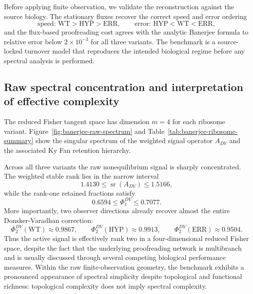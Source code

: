 \documentclass[11pt,a4paper]{article}
\numberwithin{equation}{section}
\theoremstyle{thmcompact}
\theoremstyle{remark}
\begin{document}
Before applying finite observation, we validate the reconstruction against the source biology. The stationary fluxes recover the correct speed and error ordering
\begin{equation}
\text{speed: WT} > \text{HYP} > \text{ERR},
\qquad
\text{error: HYP} < \text{WT} < \text{ERR},
\end{equation}
and the flux-based proofreading cost agrees with the analytic Banerjee formula to relative error below \(2\times 10^{-3}\) for all three variants. The benchmark is a source-locked turnover model that reproduces the intended biological regime before any spectral analysis is performed.

\subsection{Raw spectral concentration and interpretation of effective complexity}

The reduced Fisher tangent space has dimension \(m=4\) for each ribosome variant. Figure~\ref{fig:banerjee-raw-spectrum} and Table~\ref{tab:banerjee-ribosome-summary} show the singular spectrum of the weighted signal operator \(A_{DV}\) and the associated Ky Fan retention hierarchy.

Across all three variants the raw nonequilibrium signal is sharply concentrated. The weighted stable rank lies in the narrow interval
\begin{equation}
1.4130 \leq \operatorname{sr}(A_{DV}) \leq 1.5166,
\end{equation}
while the rank-one retained fractions satisfy
\begin{equation}
0.6594 \leq \Phi^{DV}_{1} \leq 0.7077.
\end{equation}
More importantly, two observer directions already recover almost the entire Donsker-Varadhan correction:
\begin{equation}
\Phi^{DV}_{2}(\mathrm{WT})\approx 0.9867,
\qquad
\Phi^{DV}_{2}(\mathrm{HYP})\approx 0.9913,
\qquad
\Phi^{DV}_{2}(\mathrm{ERR})\approx 0.9504.
\end{equation}
Thus the active signal is effectively rank two in a four-dimensional reduced Fisher space, despite the fact that the underlying proofreading network is multibranch and is usually discussed through several competing biological performance measures. Within the raw finite-observation geometry, the benchmark exhibits a pronounced appearance of spectral simplicity despite topological and functional richness: topological complexity does not imply spectral complexity.
\end{document}

